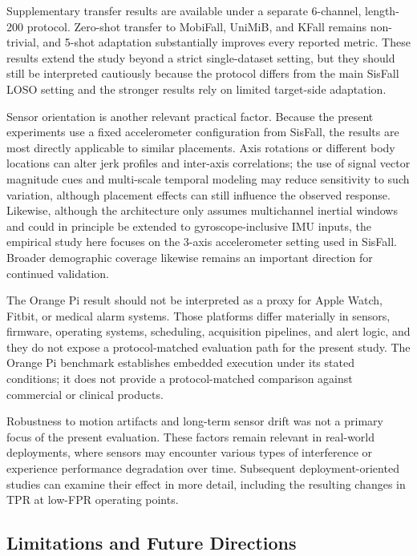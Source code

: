 \documentclass[jec]{acnsart}
\begin{document}
Supplementary transfer results are available under a separate 6-channel, length-200 protocol. Zero-shot transfer to MobiFall, UniMiB, and KFall remains non-trivial, and 5-shot adaptation substantially improves every reported metric. These results extend the study beyond a strict single-dataset setting, but they should still be interpreted cautiously because the protocol differs from the main SisFall LOSO setting and the stronger results rely on limited target-side adaptation.

Sensor orientation is another relevant practical factor. Because the present experiments use a fixed accelerometer configuration from SisFall, the results are most directly applicable to similar placements. Axis rotations or different body locations can alter jerk profiles and inter-axis correlations; the use of signal vector magnitude cues and multi-scale temporal modeling may reduce sensitivity to such variation, although placement effects can still influence the observed response. Likewise, although the architecture only assumes multichannel inertial windows and could in principle be extended to gyroscope-inclusive IMU inputs, the empirical study here focuses on the 3-axis accelerometer setting used in SisFall. Broader demographic coverage likewise remains an important direction for continued validation.

The Orange Pi result should not be interpreted as a proxy for Apple Watch, Fitbit, or medical alarm systems. Those platforms differ materially in sensors, firmware, operating systems, scheduling, acquisition pipelines, and alert logic, and they do not expose a protocol-matched evaluation path for the present study. The Orange Pi benchmark establishes embedded execution under its stated conditions; it does not provide a protocol-matched comparison against commercial or clinical products.

Robustness to motion artifacts and long-term sensor drift was not a primary focus of the present evaluation. These factors remain relevant in real-world deployments, where sensors may encounter various types of interference or experience performance degradation over time. Subsequent deployment-oriented studies can examine their effect in more detail, including the resulting changes in TPR at low-FPR operating points.

\subsection{Limitations and Future Directions}
\end{document}
